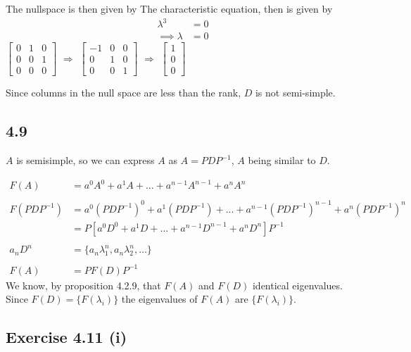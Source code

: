 \documentclass[letterpaper,12pt]{article}
\theoremstyle{definition}
\begin{document}
The nullspace is then given by 
The characteristic equation, then is given by 
\begin{align*}
\lambda^3 &= 0\\
\implies \lambda &= 0
\end{align*}
$\begin{bmatrix} 
    0 & 1 & 0\\
    0 & 0 & 1\\
    0 & 0 & 0
\end{bmatrix}$  
$\Rightarrow$ 
$\begin{bmatrix} 
    -1 & 0 & 0\\
    0 & 1 & 0\\
    0 & 0 & 1 
\end{bmatrix}$
$\Rightarrow$
$\begin{bmatrix}
1\\
0\\
0
\end{bmatrix}$\\

\bigskip

Since columns in the null space are less than the rank, $D$ is not semi-simple.
\subsection*{4.9}
$A$ is semisimple, so we can express $A$ as $A = PDP^{-1}$, $A$ being similar to $D$. 

\begin{align*}
F(A) &= a^{0}A^{0} + a^{1}A + ... + a^{n-1}A^{n-1} + a^{n}A^{n} \\ \\
F(PDP^{-1}) &= a^{0}(PDP^{-1})^{0} + a^{1}(PDP^{-1}) + ... + a^{n-1}(PDP^{-1})^{n-1} + a^{n}(PDP^{-1})^{n}\\
&= P[a^{0}D^{0} + a^{1}D + ... + a^{n-1}D^{n-1} + a^{n}D^{n}]P^{-1}\\ \\
a_{n}D^{n} &= \{a_{n}\lambda_{1}^{n}, a_{n}\lambda_{2}^{n}, ...\} \\ \\
F(A) &= PF(D)P^{-1}
\end{align*}
We know, by proposition 4.2.9, that $F(A)$ and $F(D)$ identical eigenvalues. Since $F(D) = \{F(\lambda_{i})\}$ the eigenvalues of $F(A)$ are $\{F(\lambda_{i})\}$.


\subsection*{Exercise 4.11 (i)}
\end{document}
